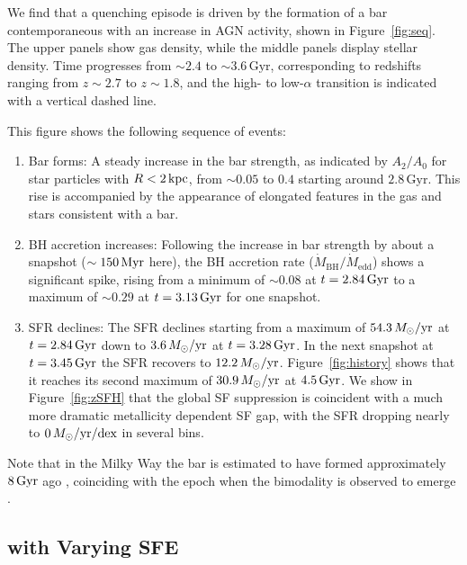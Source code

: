 We find that a quenching episode is driven by the formation of a bar contemporaneous with an increase in AGN activity, shown in Figure~\ref{fig:seq}. The upper panels show gas density, while the middle panels display stellar density. Time progresses from $\sim2.4$ to $\sim3.6\,\textrm{Gyr}$, corresponding to redshifts ranging from $z\sim2.7$ to $z\sim1.8$, and the high- to low-$\alpha$ transition is indicated with a vertical dashed line.

This figure shows the following sequence of events:
\begin{enumerate}
    \item Bar forms: A steady increase in the bar strength, as indicated by $A_2/A_0$ for star particles with $R<2\,\textrm{kpc}$, from $\sim0.05$ to $0.4$ starting around $2.8\,\textrm{Gyr}$. This rise is accompanied by the appearance of elongated features in the gas and stars consistent with a bar.
    \item BH accretion increases: Following the increase in bar strength by about a snapshot ($\sim150\,\textrm{Myr}$ here), the BH accretion rate ($\dot{M}_{\textrm{BH}}/\dot{M}_{\textrm{edd}}$) shows a significant spike, rising from a minimum of $\sim0.08$ at $t=2.84\,\textrm{Gyr}$ to a maximum of $\sim0.29$ at $t=3.13\,\textrm{Gyr}$ for one snapshot.
    \item SFR declines: The SFR declines starting from a maximum of $54.3\,M_{\odot}/\textrm{yr}$ at $t=2.84\,\textrm{Gyr}$ down to $3.6\,M_{\odot}/\textrm{yr}$ at $t=3.28\,\textrm{Gyr}$. In the next snapshot at $t=3.45\,\textrm{Gyr}$ the SFR recovers to $12.2\,M_{\odot}/\textrm{yr}$. Figure~\ref{fig:history} shows that it reaches its second maximum of $30.9\,M_{\odot}/\textrm{yr}$ at $4.5\,\textrm{Gyr}$. We show in Figure~\ref{fig:zSFH} that the global SF suppression is coincident with a much more dramatic metallicity dependent SF gap, with the SFR dropping nearly to $0\,M_{\odot}/\textrm{yr}/\textrm{dex}$ in several bins.
\end{enumerate}

Note that in the Milky Way the bar is estimated to have formed approximately $8\,\textrm{Gyr}$ ago \citep{2019MNRAS.490.4740B,2024MNRAS.530.2972S}, coinciding with the epoch when the bimodality is observed to emerge \citep{2013A&A...560A.109H,2023MNRAS.525.2208R,2024MNRAS.535..392L}.

\subsection{\alphaFe{} with Varying SFE}\label{ssec:onezone}

